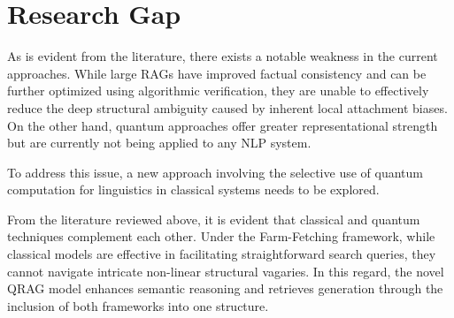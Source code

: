 \section{Research Gap}

As is evident from the literature, there exists a notable weakness in the current approaches. While large RAGs have improved factual consistency and can be further optimized using algorithmic verification, they are unable to effectively reduce the deep structural ambiguity caused by inherent local attachment biases. On the other hand, quantum approaches offer greater representational strength but are currently not being applied to any NLP system.

To address this issue, a new approach involving the selective use of quantum computation for linguistics in classical systems needs to be explored.

\bigskip\noindent
From the literature reviewed above, it is evident that classical and quantum techniques complement each other. Under the Farm-Fetching framework, while classical models are effective in facilitating straightforward search queries, they cannot navigate intricate non-linear structural vagaries. In this regard, the novel QRAG model enhances semantic reasoning and retrieves generation through the inclusion of both frameworks into one structure.
